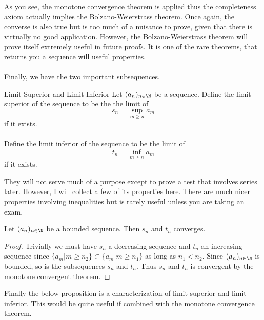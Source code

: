 As you see, the monotone convergence theorem is applied thus the completeness axiom actually implies the Bolzano-Weierstrass theorem. Once again, the converse is also true but is too much of a nuisance to prove, given that there is virtually no good application. However, the Bolzano-Weierstrass theorem will prove itself extremely useful in future proofs. It is one of the rare theorems, that returns you a sequence will useful properties. \\~\\

Finally, we have the two important subsequences. 

\begin{defn}{Limit Superior and Limit Inferior}{} Let $(a_n)_{n\in\N}$ be a sequence. Define the limit superior of the sequence to be the the limit of $$s_n=\sup_{m\geq n}a_m$$ if it exists. \\~\\ Define the limit inferior of the sequence to be the limit of $$t_n=\inf_{m\geq n}a_m$$ if it exists. 
\end{defn}

They will not serve much of a purpose except to prove a test that involves series later. However, I will collect a few of its properties here. There are much nicer properties involving inequalities but is rarely useful unless you are taking an exam. 

\begin{prp}{}{} Let $(a_n)_{n\in\N}$ be a bounded sequence. Then $s_n$ and $t_n$ converges. \tcbline
\begin{proof}
Trivially we must have $s_n$ a decreasing sequence and $t_n$ an increasing sequence since $\{a_m|m\geq n_2\}\subset\{a_m|m\geq n_1\}$ as long as $n_1<n_2$. Since $(a_n)_{n\in\N}$ is bounded, so is the subsequences $s_n$ and $t_n$. Thus $s_n$ and $t_n$ is convergent by the monotone convergent theorem. 
\end{proof}
\end{prp}

Finally the below proposition is a characterization of limit superior and limit inferior. This would be quite useful if combined with the monotone convergence theorem. 


